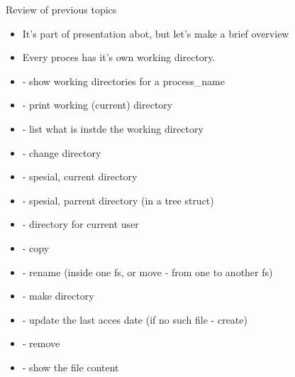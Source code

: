 \documentclass[usenames,dvipsnames,10pt,aspectratio=169]{beamer}
\begin{document}
\begin{frame}{Review of previous topics}
    \begin{itemize}
        \item It's part of presentation abot, but let's make a brief overview
        \item Every proces has it's own working directory. 
        \item {} - show working directories for a process\_name
        \item {} - print working (current) directory
        \item {} - list what is instde the working directory
        \item {} - change directory
        \item {} - spesial, current directory
        \item {} - spesial, parrent directory (in a tree struct)
        \item \ex{$\sim$/} -  directory for current user
        \item {} - copy 
        \item {} - rename (inside one fs, or move - from one to another fs)
        \item {} - make directory
        \item {} - update the last acces date (if no such file - create)
        \item {} - remove
        \item {} - show the file content
    \end{itemize}
\end{frame}

\end{document}

